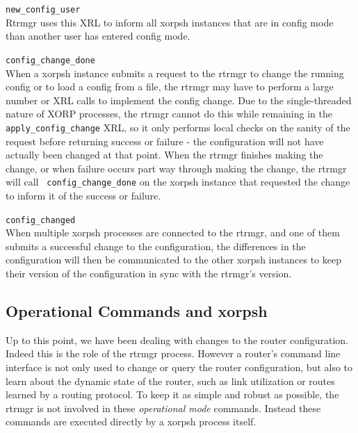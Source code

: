 \documentclass[11pt]{article}
\begin{document}
\begin{description}

  \item{\tt new\_config\_user} \\Rtrmgr uses this XRL to inform all
xorpsh instances that are in config mode than another user has entered
config mode.

  \item{\tt config\_change\_done} \\When a xorpsh instance submits a
request to the rtrmgr to change the running config or to load a config
from a file, the rtrmgr may have to perform a large number or XRL calls
to implement the config change.  Due to the single-threaded nature of
XORP processes, the rtrmgr cannot do this while remaining in the {\tt
apply\_config\_change} XRL, so it only performs local checks on the
sanity of the request before returning success or failure - the
configuration will not have actually been changed at that point.  When
the rtrmgr finishes making the change, or when failure occurs part way
through making the change, the rtrmgr will call {\tt
config\_change\_done} on the xorpsh instance that requested the change
to inform it of the success or failure.

  \item{\tt config\_changed} \\When multiple xorpsh processes are
connected to the rtrmgr, and one of them submits a successful change
to the configuration, the differences in the configuration will then
be communicated to the other xorpsh instances to keep their version of
the configuration in sync with the rtrmgr's version.

\end{description}

\subsection{Operational Commands and xorpsh}

Up to this point, we have been dealing with changes to the router
configuration.  Indeed this is the role of the rtrmgr process.
However a router's command line interface is not only used to change
or query the router configuration, but also to learn about the dynamic
state of the router, such as link utilization or routes learned by a
routing protocol.  To keep it as simple and robust as possible, the
rtrmgr is not involved in these \textit{operational mode} commands.
Instead these commands are executed directly by a xorpsh process
itself.
\end{document}
